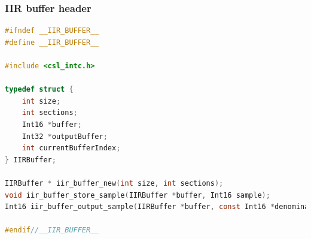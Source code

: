 \documentclass[11pt,a4paper]{article}
\begin{document}
	\subsubsection{IIR buffer header}
	\begin{lstlisting}[language=c]
#ifndef __IIR_BUFFER__
#define __IIR_BUFFER__

#include <csl_intc.h>

typedef struct {
	int size;
	int sections;
	Int16 *buffer;
	Int32 *outputBuffer;
	int currentBufferIndex;
} IIRBuffer;

IIRBuffer * iir_buffer_new(int size, int sections);
void iir_buffer_store_sample(IIRBuffer *buffer, Int16 sample);
Int16 iir_buffer_output_sample(IIRBuffer *buffer, const Int16 *denominator, const Int16 *numerator);

#endif//__IIR_BUFFER__
		
	\end{lstlisting}
	\clearpage
	
\end{document}
